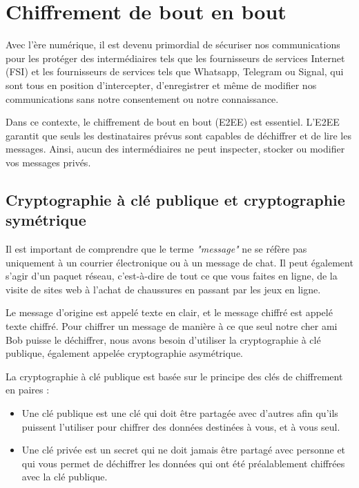 \section{Chiffrement de bout en bout}

Avec l'ère numérique, il est devenu primordial de sécuriser nos communications pour les protéger des intermédiaires tels que les fournisseurs de services Internet (FSI) et les fournisseurs de services tels que Whatsapp, Telegram ou Signal, qui sont tous en position d'intercepter, d'enregistrer et même de modifier nos communications sans notre consentement ou notre connaissance.

Dans ce contexte, le chiffrement de bout en bout (E2EE) est essentiel. L'E2EE garantit que seuls les destinataires prévus sont capables de déchiffrer et de lire les messages. Ainsi, aucun des intermédiaires ne peut inspecter, stocker ou modifier vos messages privés.

\subsection{Cryptographie à clé publique et cryptographie symétrique}

Il est important de comprendre que le terme \textit{"message"} ne se réfère pas uniquement à un courrier électronique ou à un message de chat. Il peut également s'agir d'un paquet réseau, c'est-à-dire de tout ce que vous faites en ligne, de la visite de sites web à l'achat de chaussures en passant par les jeux en ligne.

Le message d'origine est appelé texte en clair, et le message chiffré est appelé texte chiffré. Pour chiffrer un message de manière à ce que seul notre cher ami Bob puisse le déchiffrer, nous avons besoin d'utiliser la cryptographie à clé publique, également appelée cryptographie asymétrique.

La cryptographie à clé publique est basée sur le principe des clés de chiffrement en paires :

\begin{itemize}
    \item Une clé publique est une clé qui doit être partagée avec d'autres afin qu'ils puissent l'utiliser pour chiffrer des données destinées à vous, et à vous seul.
    \item Une clé privée est un secret qui ne doit jamais être partagé avec personne et qui vous permet de déchiffrer les données qui ont été préalablement chiffrées avec la clé publique.
\end{itemize}

